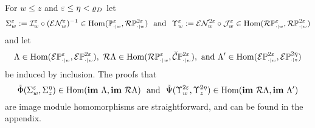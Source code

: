 
For $w\leq z$ and $\varepsilon\leq\eta < \varrho_D$ let
\[\Sigma_w^\e := \I_w^\e\circ (\E\N_w^\e)^{-1}\in \Hom(\PP{w}{\e},\RPP{w}{2\e})\ \text{ and }\ \Upsilon_w^\e := \E\N_w^{2\e}\circ \J_w^{\e}\in \Hom(\RPP{w}{\e},\RPP{w}{2\e})\]
and let
\[ \Lambda\in\Hom(\ext{\PP{w}{\e}}, \ext{\PP{w}{2\e}}),\ \rips\Lambda\in\Hom(\RPP{w}{\e},\CPP{w}{2\e}),\text{ and } \Lambda'\in\Hom(\ext{\PP{w}{2\e}},\ext{\PP{z}{2\eta}})\]
be induced by inclusion. The proofs that
\[ \tilde{\Phi}(\Sigma_w^\e,\Sigma_z^\eta)\in\Hom(\im~\Lambda,\im~\rips\Lambda)\ \text{ and }\ \tilde{\Psi}(\Upsilon_w^{2\e},\Upsilon_z^{2\eta})\in\Hom(\im~\rips\Lambda,\im~\Lambda')\]
are image module homomorphisms are straightforward, and can be found in the appendix.

